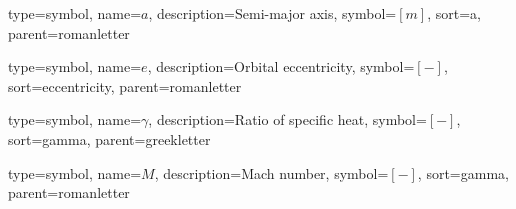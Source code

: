 %

{
type=symbol, %
name={\ensuremath{a}}, %
description={Semi-major axis}, %
symbol={$\left[m\right]$}, %
sort=a, %
parent=romanletter %
}

{
type=symbol, %
name={\ensuremath{e}}, %
description={Orbital eccentricity}, %
symbol={$\left[-\right]$}, %
sort=eccentricity, %
parent=romanletter %
}

{
type=symbol, %
name={\ensuremath{\gamma}}, %
description={Ratio of specific heat}, %
symbol={$\left[-\right]$}, %
sort=gamma, %
parent=greekletter %
}

{
type=symbol, %
name={\ensuremath{M}}, %
description={Mach number}, %
symbol={$\left[-\right]$}, %
sort=gamma, %
parent=romanletter %
}